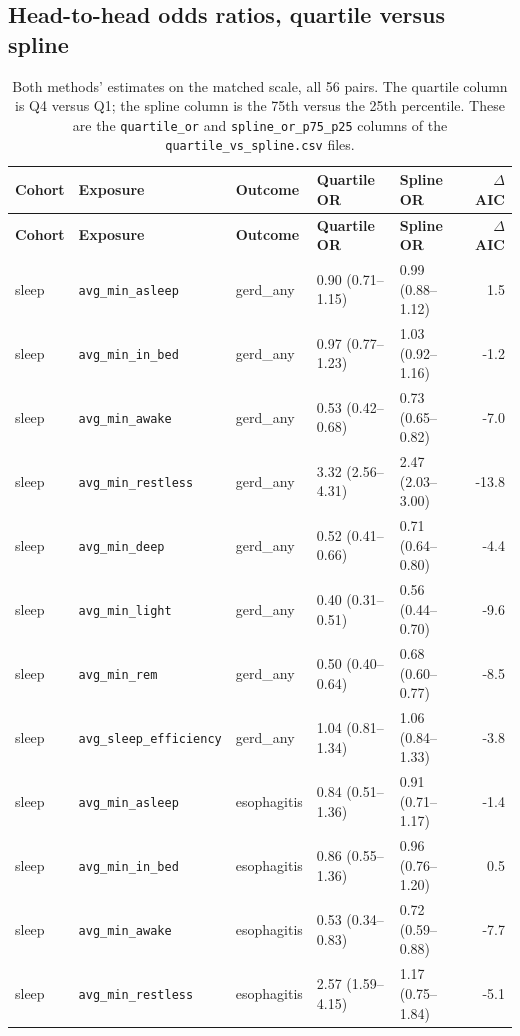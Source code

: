 \documentclass[11pt]{article}
\newcommand{\code}[1]{\texttt{\small #1}}
\begin{document}
\subsection{Head-to-head odds ratios, quartile versus spline}
\footnotesize\begin{longtable}{@{}p{1.7cm}p{3.0cm}p{1.9cm}p{2.6cm}p{2.6cm}r@{}}
\caption{Both methods' estimates on the matched scale, all 56 pairs. The quartile column is Q4 versus Q1; the spline column is the 75th versus the 25th percentile. These are the \code{quartile\_or} and \code{spline\_or\_p75\_p25} columns of the \code{quartile\_vs\_spline.csv} files.}\label{tab:appM-qvs-or}\\
\toprule \textbf{Cohort} & \textbf{Exposure} & \textbf{Outcome} & \textbf{Quartile OR} & \textbf{Spline OR} & \textbf{$\Delta$AIC} \\ \midrule \endfirsthead
\toprule \textbf{Cohort} & \textbf{Exposure} & \textbf{Outcome} & \textbf{Quartile OR} & \textbf{Spline OR} & \textbf{$\Delta$AIC} \\ \midrule \endhead
sleep & \code{avg\_min\_asleep} & gerd\_any & 0.90 (0.71--1.15) & 0.99 (0.88--1.12) & 1.5 \\
sleep & \code{avg\_min\_in\_bed} & gerd\_any & 0.97 (0.77--1.23) & 1.03 (0.92--1.16) & -1.2 \\
sleep & \code{avg\_min\_awake} & gerd\_any & 0.53 (0.42--0.68) & 0.73 (0.65--0.82) & -7.0 \\
sleep & \code{avg\_min\_restless} & gerd\_any & 3.32 (2.56--4.31) & 2.47 (2.03--3.00) & -13.8 \\
sleep & \code{avg\_min\_deep} & gerd\_any & 0.52 (0.41--0.66) & 0.71 (0.64--0.80) & -4.4 \\
sleep & \code{avg\_min\_light} & gerd\_any & 0.40 (0.31--0.51) & 0.56 (0.44--0.70) & -9.6 \\
sleep & \code{avg\_min\_rem} & gerd\_any & 0.50 (0.40--0.64) & 0.68 (0.60--0.77) & -8.5 \\
sleep & \code{avg\_sleep\_efficiency} & gerd\_any & 1.04 (0.81--1.34) & 1.06 (0.84--1.33) & -3.8 \\
sleep & \code{avg\_min\_asleep} & esophagitis & 0.84 (0.51--1.36) & 0.91 (0.71--1.17) & -1.4 \\
sleep & \code{avg\_min\_in\_bed} & esophagitis & 0.86 (0.55--1.36) & 0.96 (0.76--1.20) & 0.5 \\
sleep & \code{avg\_min\_awake} & esophagitis & 0.53 (0.34--0.83) & 0.72 (0.59--0.88) & -7.7 \\
sleep & \code{avg\_min\_restless} & esophagitis & 2.57 (1.59--4.15) & 1.17 (0.75--1.84) & -5.1 \\

\end{longtable}
\end{document}

